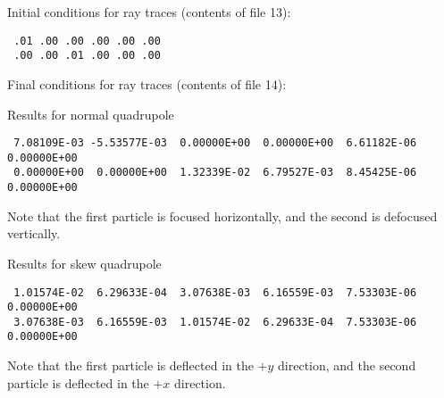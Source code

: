 Initial conditions for ray traces (contents of file 13):
\begin{footnotesize}
\begin{verbatim}
 .01 .00 .00 .00 .00 .00
 .00 .00 .01 .00 .00 .00
\end{verbatim}
\end{footnotesize}
Final conditions for ray traces (contents of file 14):
\vspace{5mm}

\noindent Results for normal quadrupole
\begin{footnotesize}
\begin{verbatim}
 7.08109E-03 -5.53577E-03  0.00000E+00  0.00000E+00  6.61182E-06  0.00000E+00
 0.00000E+00  0.00000E+00  1.32339E-02  6.79527E-03  8.45425E-06  0.00000E+00
\end{verbatim}
\end{footnotesize}
Note that the first particle is focused horizontally, and the second is
defocused vertically.
\vspace{5mm}

\noindent Results for skew quadrupole
\begin{footnotesize}
\begin{verbatim}
 1.01574E-02  6.29633E-04  3.07638E-03  6.16559E-03  7.53303E-06  0.00000E+00
 3.07638E-03  6.16559E-03  1.01574E-02  6.29633E-04  7.53303E-06  0.00000E+00
\end{verbatim}
\end{footnotesize}
Note that the first particle is deflected in the $+y$ direction, and the
second particle is deflected in the $+x$ direction.


\newpage
